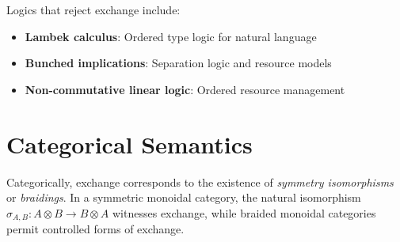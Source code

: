 Logics that reject exchange include:
\begin{itemize}
    \item \textbf{Lambek calculus}: Ordered type logic for natural language
    \item \textbf{Bunched implications}: Separation logic and resource models
    \item \textbf{Non-commutative linear logic}: Ordered resource management
\end{itemize}

\section*{Categorical Semantics}
\label{sec-exchange-categorical}

Categorically, exchange corresponds to the existence of \emph{symmetry isomorphisms} or \emph{braidings}. In a symmetric monoidal category, the natural isomorphism $\sigma_{A,B} : A \otimes B \to B \otimes A$ witnesses exchange, while braided monoidal categories permit controlled forms of exchange.

% 
% 
% 
% 
% 
